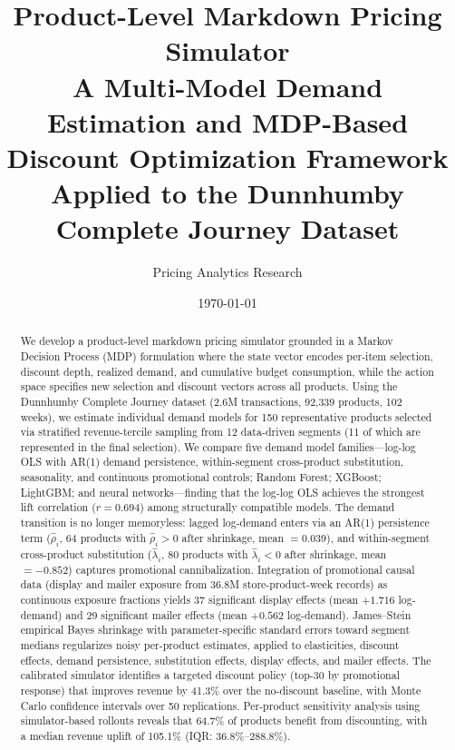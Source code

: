 \documentclass[12pt,a4paper]{article}
\title{%
    \textbf{Product-Level Markdown Pricing Simulator} \\[6pt]
    \large A Multi-Model Demand Estimation and MDP-Based \\
    Discount Optimization Framework \\[6pt]
    \normalsize Applied to the Dunnhumby Complete Journey Dataset
}
\author{Pricing Analytics Research}
\date{\today}
\begin{document}
\maketitle

\begin{abstract}
We develop a product-level markdown pricing simulator grounded in a
Markov Decision Process (MDP) formulation where the state vector
encodes per-item selection, discount depth, realized demand, and
cumulative budget consumption, while the action space specifies new
selection and discount vectors across all products. Using the
Dunnhumby Complete Journey dataset (2.6M transactions, 92,339
products, 102 weeks), we estimate individual demand models for 150
representative products selected via stratified revenue-tercile
sampling from 12 data-driven segments (11 of which are represented
in the final selection). We compare five demand model
families---log-log OLS with AR(1) demand persistence, within-segment
cross-product substitution, seasonality, and continuous promotional
controls; Random Forest; XGBoost; LightGBM; and neural
networks---finding that the log-log OLS achieves the strongest lift
correlation ($r = 0.694$) among structurally compatible models.
The demand transition is no longer memoryless: lagged log-demand
enters via an AR(1) persistence term ($\hat{\rho}_i$, 64 products
with $\hat{\rho}_i > 0$ after shrinkage, mean $= 0.039$), and
within-segment cross-product substitution ($\hat{\lambda}_i$, 80
products with $\hat{\lambda}_i < 0$ after shrinkage, mean $=
-0.852$) captures promotional cannibalization. Integration of
promotional causal data (display and mailer exposure from 36.8M
store-product-week records) as continuous exposure fractions yields
37 significant display effects (mean $+1.716$ log-demand) and 29
significant mailer effects (mean $+0.562$ log-demand).
James--Stein empirical Bayes shrinkage with parameter-specific
standard errors toward segment medians regularizes noisy per-product
estimates, applied to elasticities, discount effects, demand
persistence, substitution effects, display effects, and mailer
effects. The calibrated simulator identifies a targeted discount
policy (top-30 by promotional response) that improves revenue by
41.3\% over the no-discount baseline, with Monte Carlo confidence
intervals over 50 replications. Per-product sensitivity analysis
using simulator-based rollouts reveals that 64.7\% of products
benefit from discounting, with a median revenue uplift of 105.1\%
(IQR: 36.8\%--288.8\%).
\end{abstract}
\end{document}
